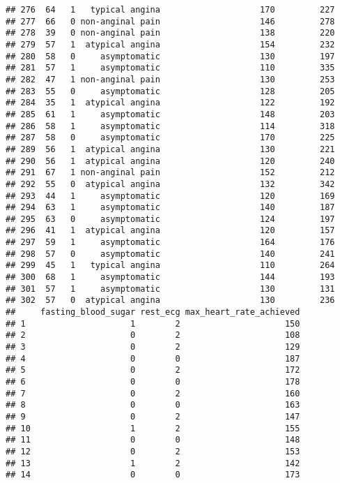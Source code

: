 \documentclass[]{article}
\begin{document}
\begin{verbatim}
## 276  64   1   typical angina                    170         227
## 277  66   0 non-anginal pain                    146         278
## 278  39   0 non-anginal pain                    138         220
## 279  57   1  atypical angina                    154         232
## 280  58   0     asymptomatic                    130         197
## 281  57   1     asymptomatic                    110         335
## 282  47   1 non-anginal pain                    130         253
## 283  55   0     asymptomatic                    128         205
## 284  35   1  atypical angina                    122         192
## 285  61   1     asymptomatic                    148         203
## 286  58   1     asymptomatic                    114         318
## 287  58   0     asymptomatic                    170         225
## 289  56   1  atypical angina                    130         221
## 290  56   1  atypical angina                    120         240
## 291  67   1 non-anginal pain                    152         212
## 292  55   0  atypical angina                    132         342
## 293  44   1     asymptomatic                    120         169
## 294  63   1     asymptomatic                    140         187
## 295  63   0     asymptomatic                    124         197
## 296  41   1  atypical angina                    120         157
## 297  59   1     asymptomatic                    164         176
## 298  57   0     asymptomatic                    140         241
## 299  45   1   typical angina                    110         264
## 300  68   1     asymptomatic                    144         193
## 301  57   1     asymptomatic                    130         131
## 302  57   0  atypical angina                    130         236
##     fasting_blood_sugar rest_ecg max_heart_rate_achieved
## 1                     1        2                     150
## 2                     0        2                     108
## 3                     0        2                     129
## 4                     0        0                     187
## 5                     0        2                     172
## 6                     0        0                     178
## 7                     0        2                     160
## 8                     0        0                     163
## 9                     0        2                     147
## 10                    1        2                     155
## 11                    0        0                     148
## 12                    0        2                     153
## 13                    1        2                     142
## 14                    0        0                     173

\end{verbatim}
\end{document}
